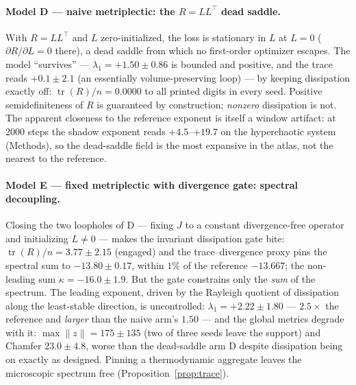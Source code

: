 \documentclass[11pt]{article}
\newcommand{\tr}{\operatorname{tr}}
\begin{document}
\paragraph{Model D --- naive metriplectic: the $R=LL^\top$ dead saddle.}
With $R=LL^\top$ and $L$ zero-initialized, the loss is stationary in $L$
at $L=0$ ($\partial R/\partial L=0$ there), a dead saddle from which no
first-order optimizer escapes. The model ``survives'' --- $\lambda_1=
+1.50\pm0.86$ is bounded and positive, and the trace reads $+0.1\pm2.1$
(an essentially volume-preserving loop) --- by keeping dissipation
exactly off: $\tr(R)/n=0.0000$ to all printed digits in every seed.
Positive semidefiniteness of $R$ is guaranteed by construction;
\emph{nonzero} dissipation is not. The apparent closeness to the
reference exponent is itself a window artifact: at 2000 steps the
shadow exponent reads $+4.5$--$+19.7$ on the hyperchaotic system
(Methods), so the dead-saddle field is the most expansive in the
atlas, not the nearest to the reference.

\paragraph{Model E --- fixed metriplectic with divergence gate: spectral
decoupling.}
Closing the two loopholes of D --- fixing $J$ to a constant
divergence-free operator and initializing $L\neq0$ --- makes the
invariant dissipation gate bite: $\tr(R)/n=3.77\pm2.15$ (engaged) and the
trace--divergence proxy pins the spectral sum to $-13.80\pm0.17$,
within $1\%$ of the reference $-13.667$; the non-leading sum
$\kappa=-16.0\pm1.9$. But the gate constrains only the \emph{sum} of the
spectrum. The leading exponent, driven by the Rayleigh quotient of
dissipation along the least-stable direction, is uncontrolled:
$\lambda_1=+2.22\pm1.80$ --- $2.5\times$ the reference and \emph{larger}
than the naive arm's $1.50$ --- and the global metrics degrade with it:
$\max\|z\|=175\pm135$ (two of three seeds leave the support) and Chamfer
$23.0\pm4.8$, worse than the dead-saddle arm D despite dissipation being
on exactly as designed. Pinning a thermodynamic aggregate leaves the
microscopic spectrum free (Proposition~\ref{prop:trace}).
\end{document}
